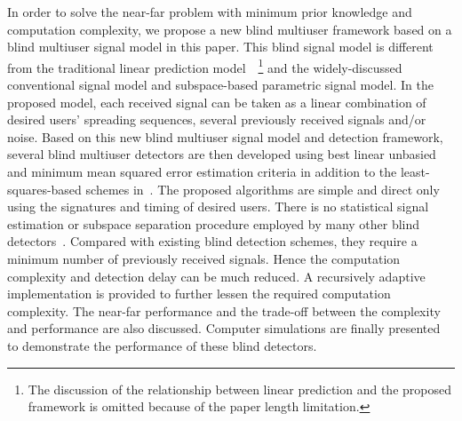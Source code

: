 \documentclass[a4paper,10pt,fleqn, twocolumn]{IEEETran}
\begin{document}
In order to solve the near-far problem with minimum prior
knowledge and computation complexity, we propose a new blind
multiuser framework based on a blind multiuser signal model in
this paper. This blind signal model is different from the
traditional linear prediction model~\cite{Haykin96}~\footnote{The
discussion of the relationship between linear prediction and the
proposed framework is omitted because of the paper length
limitation.} and the widely-discussed conventional signal model
and subspace-based parametric signal model. In the proposed model,
each received signal can be taken as a linear combination of
desired users' spreading sequences, several previously received
signals and/or noise. Based on this new blind multiuser signal
model and detection framework, several blind multiuser detectors
are then developed using best linear unbasied and minimum mean
squared error estimation criteria in addition to the
least-squares-based schemes in~\cite{Wang03d,Wang03e}. The
proposed algorithms are simple and direct only using the
signatures and timing of desired users. There is no statistical
signal estimation or subspace separation procedure employed by
many other blind detectors~\cite{Madh94,Honi95,Wang98,Wang99}.
Compared with existing blind detection schemes, they require a
minimum number of previously received signals. Hence the
computation complexity and detection delay can be much reduced. A
recursively adaptive implementation is provided to further lessen
the required computation complexity. The near-far performance and
the trade-off between the complexity and performance are also
discussed. Computer simulations are finally presented to
demonstrate the performance of these blind detectors.
\end{document}
